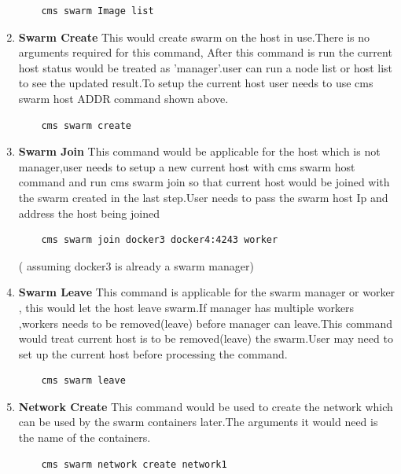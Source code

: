 \documentclass[9pt,twocolumn,twoside]{../../styles/osajnl}
\begin{document}
\begin{enumerate}
    \begin{verbatim}
    cms swarm Image list
    \end{verbatim} 

    
    \item \textbf{Swarm Create}
    This would create swarm on the host in use.There is no arguments required for this command, After this command is run the current host status would be treated as 'manager'.user can run a node list or host list to see the updated result.To setup the current host user needs to use cms swarm host ADDR command shown above.
    
    \begin{verbatim}
    cms swarm create
    \end{verbatim} 
    
    \item \textbf{Swarm Join}
    This command would be applicable for the host which is not manager,user needs to setup a new current host with cms swarm host command and run cms swarm join so that current host would be joined with the swarm created in the last step.User needs to pass the swarm host Ip and address the host being joined
    
    \begin{verbatim}
    cms swarm join docker3 docker4:4243 worker
    \end{verbatim} 
    ( assuming docker3 is already a swarm manager) 
    
    \item \textbf{Swarm Leave}
    This command is applicable for the swarm manager or worker , this would let the host leave swarm.If manager has multiple workers ,workers needs to be removed(leave) before manager can leave.This command would treat current host is to be removed(leave) the swarm.User may need to set up the current host before processing the command.
    
    \begin{verbatim}
    cms swarm leave 
    \end{verbatim}

    
    \item \textbf{Network Create}
    This command would be used to create the network which can be used by the swarm containers later.The arguments it would need is the name of the containers.
    
    \begin{verbatim}
    cms swarm network create network1 
    \end{verbatim}
    

\end{enumerate}
\end{document}
